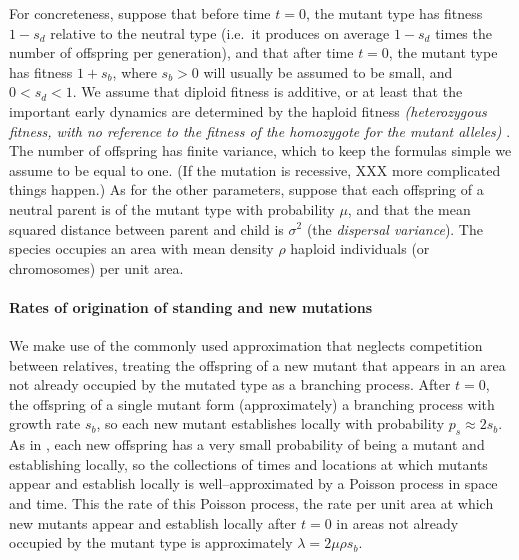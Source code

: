 \documentclass{article}
\newcommand{\gc}[1]{{\it\color{green}(#1)} }
\begin{document}
For concreteness, suppose that before time $t=0$,
the mutant type has fitness $1-s_d$ relative to the neutral type
(i.e.\ it produces on average $1-s_d$ times the number of offspring per generation),
and that after time $t=0$,
the mutant type has fitness $1+s_b$,
where $s_b>0$ will usually be assumed to be small, and $0<s_d<1$.
We assume that diploid fitness is additive, or at least that the
important early dynamics are determined by the haploid fitness
\gc{heterozygous fitness, with no reference to the fitness of the
  homozygote for the mutant alleles}.
The number of offspring has finite variance, which to keep the formulas simple we assume to be equal to one.
(If the mutation is recessive, XXX more complicated things happen.)
As for the other parameters,
suppose that each offspring of a neutral parent is of the mutant type with probability $\mu$,
and that the mean squared distance between parent and child is $\sigma^2$ (the {\em dispersal variance}).
The species occupies an area with mean density
$\rho$ haploid individuals (or chromosomes) per unit area.



\paragraph{Rates of origination of standing and new mutations}
We make use of the commonly used approximation that neglects competition between relatives,
treating the offspring of a new mutant that appears in an area not already occupied by the mutated type
as a branching process.
After $t=0$, the offspring of a single mutant form (approximately) a branching process with growth rate $s_b$,
so each new mutant establishes locally with probability $p_s \approx 2s_b$.
As in \cite{ralphcoop2010}, each new offspring has a very small probability of being a mutant and establishing locally,
so the collections of times and locations at which mutants appear and establish locally 
is well--approximated by a Poisson process in space and time.
This the rate of this Poisson process, 
the rate per unit area at which new mutants appear and establish locally after $t=0$ in areas not already occupied by the mutant type
is approximately $\lambda = 2 \mu \rho s_b$.
\end{document}
